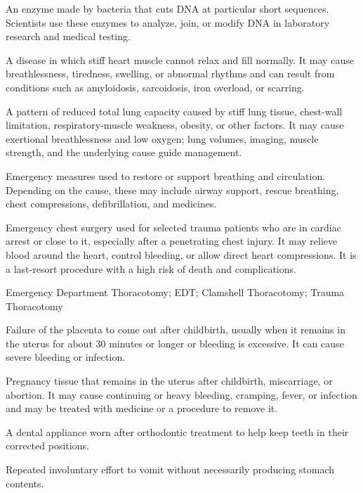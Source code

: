  An enzyme made by bacteria that cuts DNA at particular short sequences. Scientists use these enzymes to analyze, join, or modify DNA in laboratory research and medical testing.

 A disease in which stiff heart muscle cannot relax and fill normally. It may cause breathlessness, tiredness, swelling, or abnormal rhythms and can result from conditions such as amyloidosis, sarcoidosis, iron overload, or scarring.

 A pattern of reduced total lung capacity caused by stiff lung tissue, chest-wall limitation, respiratory-muscle weakness, obesity, or other factors. It may cause exertional breathlessness and low oxygen; lung volumes, imaging, muscle strength, and the underlying cause guide management.

 Emergency measures used to restore or support breathing and circulation. Depending on the cause, these may include airway support, rescue breathing, chest compressions, defibrillation, and medicines.

 Emergency chest surgery used for selected trauma patients who are in cardiac arrest or close to it, especially after a penetrating chest injury. It may relieve blood around the heart, control bleeding, or allow direct heart compressions. It is a last-resort procedure with a high risk of death and complications.

\synonyms
Emergency Department Thoracotomy; EDT; Clamshell Thoracotomy; Trauma Thoracotomy

 Failure of the placenta to come out after childbirth, usually when it remains in the uterus for about 30 minutes or longer or bleeding is excessive. It can cause severe bleeding or infection.

 Pregnancy tissue that remains in the uterus after childbirth, miscarriage, or abortion. It may cause continuing or heavy bleeding, cramping, fever, or infection and may be treated with medicine or a procedure to remove it.

 A dental appliance worn after orthodontic treatment to help keep teeth in their corrected positions.

 Repeated involuntary effort to vomit without necessarily producing stomach contents.

